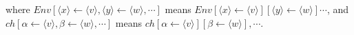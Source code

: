 where \(Env[\langle x\rangle\leftarrow\langle v\rangle,\langle y\rangle\leftarrow\langle w\rangle,\cdots]\) means \(Env[\langle x\rangle\leftarrow \langle v\rangle][\langle y\rangle\leftarrow\langle w\rangle]\cdots\), and
\(ch[\alpha\leftarrow \langle v\rangle,\beta\leftarrow \langle w\rangle,\cdots]\) means \(ch[\alpha\leftarrow\langle v\rangle][\beta\leftarrow\langle w\rangle],\cdots\).
